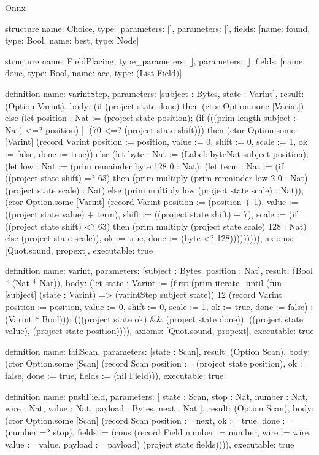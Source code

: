 \begin{lexlean}{Onnx}
\begin{semanticmodule}
structure{
  name: Choice,
  type_parameters: [],
  parameters: [],
  fields: [{name: found, type: Bool}, {name: best, type: Node}]
}

structure{
  name: FieldPlacing,
  type_parameters: [],
  parameters: [],
  fields: [{name: done, type: Bool}, {name: acc, type: (List Field)}]
}

definition{
  name: varintStep,
  parameters: [subject : Bytes, state : Varint],
  result: (Option Varint),
  body: (if (project state done) then (ctor Option.none [Varint]) else (let position : Nat := (project state position); (if (((prim length subject : Nat) <=? position) || (70 <=? (project state shift))) then (ctor Option.some [Varint] (record Varint {position := position, value := 0, shift := 0, scale := 1, ok := false, done := true})) else (let byte : Nat := (Label::byteNat subject position); (let low : Nat := (prim remainder byte 128 0 : Nat); (let term : Nat := (if ((project state shift) =? 63) then (prim multiply (prim remainder low 2 0 : Nat) (project state scale) : Nat) else (prim multiply low (project state scale) : Nat)); (ctor Option.some [Varint] (record Varint {position := (position + 1), value := ((project state value) + term), shift := ((project state shift) + 7), scale := (if ((project state shift) <? 63) then (prim multiply (project state scale) 128 : Nat) else (project state scale)), ok := true, done := (byte <? 128)})))))))),
  axioms: [Quot.sound, propext],
  executable: true
}

definition{
  name: varint,
  parameters: [subject : Bytes, position : Nat],
  result: (Bool * (Nat * Nat)),
  body: (let state : Varint := (first (prim iterate_until (fun [subject] (state : Varint) => (varintStep subject state)) 12 (record Varint {position := position, value := 0, shift := 0, scale := 1, ok := true, done := false}) : (Varint * Bool))); (((project state ok) && (project state done)), ((project state value), (project state position)))),
  axioms: [Quot.sound, propext],
  executable: true
}

definition{
  name: failScan,
  parameters: [state : Scan],
  result: (Option Scan),
  body: (ctor Option.some [Scan] (record Scan {position := (project state position), ok := false, done := true, fields := (nil Field)})),
  executable: true
}

definition{
  name: pushField,
  parameters: [
    state : Scan,
    stop : Nat,
    number : Nat,
    wire : Nat,
    value : Nat,
    payload : Bytes,
    next : Nat
  ],
  result: (Option Scan),
  body: (ctor Option.some [Scan] (record Scan {position := next, ok := true, done := (number =? stop), fields := (cons (record Field {number := number, wire := wire, value := value, payload := payload}) (project state fields))})),
  executable: true
}


\end{semanticmodule}
\end{lexlean}
